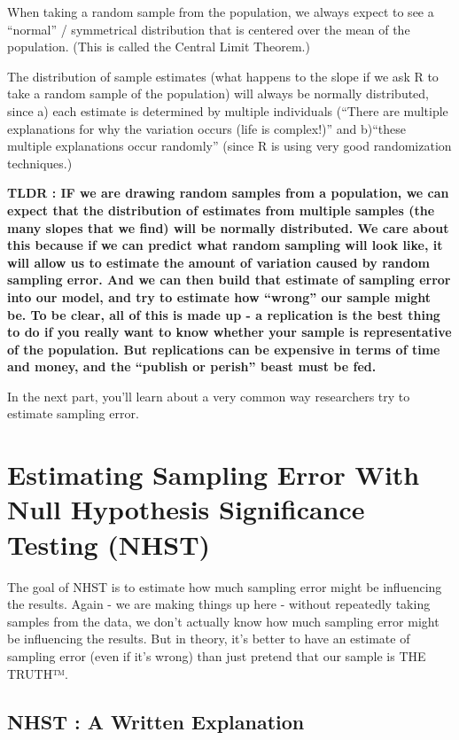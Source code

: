 \documentclass[
  letterpaper,
  DIV=11,
  numbers=noendperiod,
  oneside]{scrreprt}
\begin{document}
When taking a random sample from the population, we always expect to see
a ``normal'' / symmetrical distribution that is centered over the mean
of the population. (This is called the Central Limit Theorem.)

The distribution of sample estimates (what happens to the slope if we
ask R to take a random sample of the population) will always be normally
distributed, since a) each estimate is determined by multiple
individuals (``There are multiple explanations for why the variation
occurs (life is complex!)'' and b)``these multiple explanations occur
randomly'' (since R is using very good randomization techniques.)~

\textbf{TLDR : IF we are drawing random samples from a population, we
can expect that the distribution of estimates from multiple samples (the
many slopes that we find) will be normally distributed. We care about
this because if we can predict what random sampling will look like, it
will allow us to estimate the amount of variation caused by random
sampling error. And we can then build that estimate of sampling error
into our model, and try to estimate how ``wrong'' our sample might be.
To be clear, all of this is made up - a replication is the best thing to
do if you really want to know whether your sample is representative of
the population. But replications can be expensive in terms of time and
money, and the ``publish or perish'' beast must be fed.}

In the next part, you'll learn about a very common way researchers try
to estimate sampling error.

\section{Estimating Sampling Error With Null Hypothesis Significance
Testing
(NHST)}\label{estimating-sampling-error-with-null-hypothesis-significance-testing-nhst}

The goal of NHST is to estimate how much sampling error might be
influencing the results. Again - we are making things up here - without
repeatedly taking samples from the data, we don't actually know how much
sampling error might be influencing the results. But in theory, it's
better to have an estimate of sampling error (even if it's wrong) than
just pretend that our sample is THE TRUTH™.

\subsection{NHST : A Written
Explanation}\label{nhst-a-written-explanation}
\end{document}
